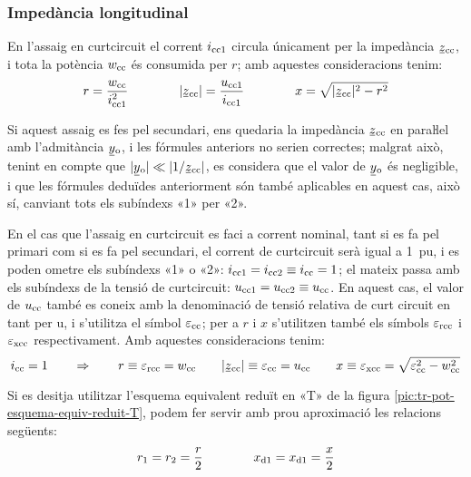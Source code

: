 \subsubsection{Impedància longitudinal}

En l'assaig en curtcircuit el corrent $i_\mathrm{cc1}$ circula
únicament per la impedància $\cmplx{z}\ped{cc}$, i tota la potència
$w_\mathrm{cc}$ és consumida per $r$; amb aquestes consideracions tenim:
\begin{equation}
    r = \frac{w\ped{cc}}{i\ped{cc1}^2} \qquad\qquad
    |\cmplx{z}\ped{cc}| = \frac{u\ped{cc1}}{i\ped{cc1}} \qquad\qquad
    x = \sqrt{|\cmplx{z}\ped{cc}|^2 - r^2}
\end{equation}

Si aquest assaig es fes pel secundari, ens quedaria la impedància
$\cmplx{z}\ped{cc}$ en paraŀlel amb l'admitància
$\cmplx{y}\ped{o}$, i les fórmules anteriors no serien
correctes; malgrat això, tenint en compte que $|\cmplx{y}\ped{o}| \ll
|1/\cmplx{z}\ped{cc}|$, es considera que el valor de
$\cmplx{y}\ped{o}$ és negligible, i que les fórmules deduïdes
anteriorment són també aplicables en aquest cas, això sí, canviant
tots els subíndexs «1» per «2».

En el cas que l'assaig en curtcircuit es faci a corrent nominal,
tant  si es fa pel primari  com si es fa pel secundari, el corrent
de curtcircuit serà igual a \qty{1}{pu}, i es poden ometre els
subíndexs «1» o «2»: $i_\mathrm{cc1} = i_\mathrm{cc2} \equiv i_\mathrm{cc} = 1$;
el mateix passa amb els subíndexs de la tensió de curtcircuit:
$u_\mathrm{cc1} = u_\mathrm{cc2} \equiv u_\mathrm{cc}$. En aquest cas, el valor
de $u_\mathrm{cc}$ també es coneix amb la denominació de
tensió relativa de curt  circuit en tant per u, i s'utilitza  el
símbol $\varepsilon_\mathrm{cc}$; per a $r$ i $x$ s'utilitzen també els
símbols $\varepsilon_\mathrm{rcc}$ i $\varepsilon_\mathrm{xcc}$
respectivament. Amb aquestes consideracions tenim:
\begin{equation}
    i\ped{cc} = 1 \qquad \Rightarrow \qquad r \equiv \varepsilon\ped{rcc} = w\ped{cc} \qquad
    |\cmplx{z}\ped{cc}| \equiv \varepsilon\ped{cc} = u\ped{cc} \qquad
    x \equiv \varepsilon\ped{xcc} = \sqrt{\varepsilon\ped{cc}^2 - w\ped{cc}^2}
    \label{eq:assaig-cc-nomianl}
\end{equation}

Si es desitja utilitzar l'esquema equivalent reduït en «T» de la figura \vref{pic:tr-pot-esquema-equiv-reduit-T}, podem fer servir amb prou aproximació les relacions següents:
\begin{equation}
    r_1 = r_2 = \frac{r}{2} \qquad\qquad x_\mathrm{d1} = x_\mathrm{d1} = \frac{x}{2}
\end{equation}


